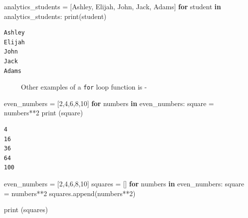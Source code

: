 \documentclass[
  letterpaper,
  DIV=11,
  numbers=noendperiod]{scrreprt}
\newenvironment{Shaded}{\begin{snugshade}}{\end{snugshade}}
\newcommand{\BuiltInTok}[1]{\textcolor[rgb]{0.00,0.23,0.31}{#1}}
\newcommand{\ControlFlowTok}[1]{\textcolor[rgb]{0.00,0.23,0.31}{\textbf{#1}}}
\newcommand{\DecValTok}[1]{\textcolor[rgb]{0.68,0.00,0.00}{#1}}
\newcommand{\KeywordTok}[1]{\textcolor[rgb]{0.00,0.23,0.31}{\textbf{#1}}}
\newcommand{\NormalTok}[1]{\textcolor[rgb]{0.00,0.23,0.31}{#1}}
\newcommand{\OperatorTok}[1]{\textcolor[rgb]{0.37,0.37,0.37}{#1}}
\newcommand{\StringTok}[1]{\textcolor[rgb]{0.13,0.47,0.30}{#1}}
\begin{document}
\begin{Shaded}
\begin{Highlighting}[]
\NormalTok{analytics\_students }\OperatorTok{=}\NormalTok{ [}\StringTok{\textquotesingle{}Ashley\textquotesingle{}}\NormalTok{, }\StringTok{\textquotesingle{}Elijah\textquotesingle{}}\NormalTok{, }\StringTok{\textquotesingle{}John\textquotesingle{}}\NormalTok{, }\StringTok{\textquotesingle{}Jack\textquotesingle{}}\NormalTok{, }\StringTok{\textquotesingle{}Adams\textquotesingle{}}\NormalTok{]}
\ControlFlowTok{for}\NormalTok{ student }\KeywordTok{in}\NormalTok{ analytics\_students:}
  \BuiltInTok{print}\NormalTok{(student)}
\end{Highlighting}
\end{Shaded}

\begin{verbatim}
Ashley
Elijah
John
Jack
Adams
\end{verbatim}

~~~~~Other examples of a \texttt{for} loop function is -

\begin{Shaded}
\begin{Highlighting}[]
\NormalTok{even\_numbers }\OperatorTok{=}\NormalTok{ [}\DecValTok{2}\NormalTok{,}\DecValTok{4}\NormalTok{,}\DecValTok{6}\NormalTok{,}\DecValTok{8}\NormalTok{,}\DecValTok{10}\NormalTok{]}
\ControlFlowTok{for}\NormalTok{ numbers }\KeywordTok{in}\NormalTok{ even\_numbers:}
\NormalTok{  square }\OperatorTok{=}\NormalTok{ numbers}\OperatorTok{**}\DecValTok{2}
  \BuiltInTok{print}\NormalTok{ (square)}
\end{Highlighting}
\end{Shaded}

\begin{verbatim}
4
16
36
64
100
\end{verbatim}

\begin{Shaded}
\begin{Highlighting}[]
\NormalTok{even\_numbers }\OperatorTok{=}\NormalTok{ [}\DecValTok{2}\NormalTok{,}\DecValTok{4}\NormalTok{,}\DecValTok{6}\NormalTok{,}\DecValTok{8}\NormalTok{,}\DecValTok{10}\NormalTok{]}
\NormalTok{squares }\OperatorTok{=}\NormalTok{ []}
\ControlFlowTok{for}\NormalTok{ numbers }\KeywordTok{in}\NormalTok{ even\_numbers:}
\NormalTok{  square }\OperatorTok{=}\NormalTok{ numbers}\OperatorTok{**}\DecValTok{2}
\NormalTok{  squares.append(numbers}\OperatorTok{**}\DecValTok{2}\NormalTok{)}

\BuiltInTok{print}\NormalTok{ (squares)}
\end{Highlighting}
\end{Shaded}
\end{document}
